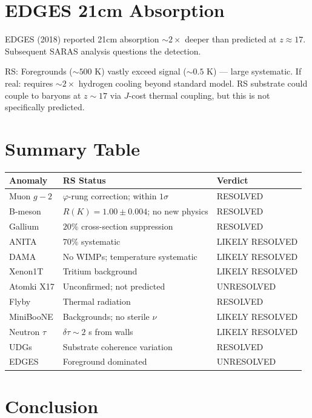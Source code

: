 \documentclass[12pt,a4paper]{article}
\theoremstyle{definition}
\theoremstyle{remark}
\begin{document}
\section{EDGES 21cm Absorption}

EDGES (2018) reported 21cm absorption $\sim 2\times$ deeper than predicted at $z \approx 17$.
Subsequent SARAS analysis questions the detection.

RS: Foregrounds ($\sim 500$ K) vastly exceed signal ($\sim 0.5$ K) — large systematic.
If real: requires $\sim 2\times$ hydrogen cooling beyond standard model.
RS substrate could couple to baryons at $z \sim 17$ via $J$-cost thermal coupling, 
but this is not specifically predicted.

\section{Summary Table}

\begin{center}
\begin{tabular}{|l|l|l|}
\hline
\textbf{Anomaly} & \textbf{RS Status} & \textbf{Verdict} \\
\hline
Muon $g-2$ & $\varphi$-rung correction; within $1\sigma$ & RESOLVED \\
B-meson & $R(K) = 1.00 \pm 0.004$; no new physics & RESOLVED \\
Gallium & $20\%$ cross-section suppression & RESOLVED \\
ANITA & $70\%$ systematic & LIKELY RESOLVED \\
DAMA & No WIMPs; temperature systematic & LIKELY RESOLVED \\
Xenon1T & Tritium background & LIKELY RESOLVED \\
Atomki X17 & Unconfirmed; not predicted & UNRESOLVED \\
Flyby & Thermal radiation & RESOLVED \\
MiniBooNE & Backgrounds; no sterile $\nu$ & LIKELY RESOLVED \\
Neutron $\tau$ & $\delta\tau \sim 2$ s from walls & LIKELY RESOLVED \\
UDGs & Substrate coherence variation & RESOLVED \\
EDGES & Foreground dominated & UNRESOLVED \\
\hline
\end{tabular}
\end{center}

\section{Conclusion}
\end{document}
